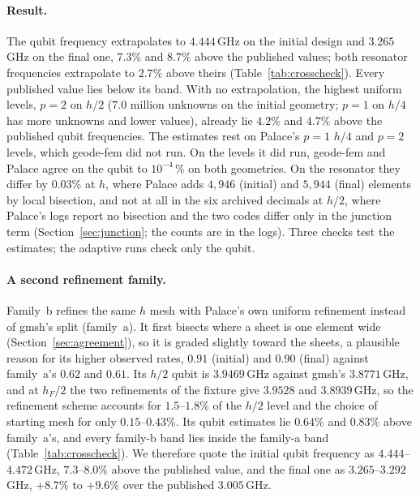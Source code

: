 \documentclass{anvil-paper}
\begin{document}
\paragraph{Result.}
The qubit frequency extrapolates to $4.444$\,GHz on the initial design
and $3.265$\,GHz on the final one, $7.3\%$ and $8.7\%$ above the
published values; both resonator frequencies extrapolate to $2.7\%$ above
theirs
(Table~\ref{tab:crosscheck}). Every published value lies below its band.
With no extrapolation, the
highest uniform levels, $p = 2$ on $h/2$ ($7.0$ million unknowns on the
initial geometry; $p = 1$ on $h/4$ has more unknowns and lower values),
already lie $4.2\%$ and $4.7\%$ above the published qubit frequencies. The
estimates rest on Palace's $p = 1$ $h/4$ and $p = 2$ levels, which
geode-fem did not run. On the levels it did run, geode-fem and Palace
agree on the qubit to $10^{-4}\,\%$ on both geometries. On the resonator
they differ by $0.03\%$ at $h$, where Palace adds $4{,}946$ (initial) and
$5{,}944$ (final) elements by local bisection, and not at all in the six
archived decimals at $h/2$, where Palace's logs report no bisection and
the two codes differ only in the junction term
(Section~\ref{sec:junction}; the counts are in the logs). Three checks
test the estimates; the adaptive runs check only the qubit.

\paragraph{A second refinement family.}
Family~b refines the same $h$ mesh with Palace's own uniform refinement
instead of gmsh's split (family~a). It first bisects where a sheet is one
element wide (Section~\ref{sec:agreement}), so it is graded slightly
toward the sheets, a plausible reason for its higher observed rates,
$0.91$ (initial) and $0.90$ (final) against family~a's $0.62$ and $0.61$.
Its $h/2$ qubit is $3.9469$\,GHz against gmsh's $3.8771$\,GHz, and at
$h_F/2$ the two refinements of the fixture give $3.9528$ and $3.8939$\,GHz, so the
refinement scheme accounts for $1.5$--$1.8\%$ of the $h/2$ level and the
choice of starting mesh for only $0.15$--$0.43\%$. Its qubit estimates lie
$0.64\%$ and $0.83\%$ above family~a's, and every family-b band lies
inside the family-a band (Table~\ref{tab:crosscheck}). We therefore quote
the initial qubit frequency as $4.444$--$4.472$\,GHz, $7.3$--$8.0\%$ above the
published value, and the final one as $3.265$--$3.292$\,GHz, $+8.7\%$ to
$+9.6\%$ over the published $3.005$\,GHz.
\end{document}
